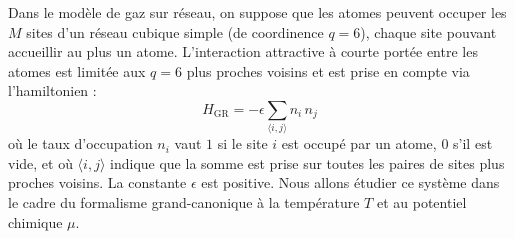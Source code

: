 Dans le modèle de gaz sur réseau, on suppose que les atomes peuvent occuper les $M$ sites d'un réseau cubique simple (de coordinence $q=6$), chaque site pouvant accueillir au plus un atome. L'interaction attractive à courte portée entre les atomes est limitée aux $q=6$ plus proches voisins et est prise en compte via l'hamiltonien :
$$
H_{\mathrm{GR}}=-\epsilon \sum_{\langle i,j\rangle} n_i\, n_j
$$
où le taux d'occupation $n_i$ vaut $1$ si le site $i$ est occupé par un atome, $0$ s'il est vide, et où ${\langle i,j\rangle}$ indique que la somme est prise sur toutes les paires de sites plus proches voisins. La constante $\epsilon$ est positive.  Nous allons étudier ce système dans le cadre du formalisme grand-canonique à la température $T$ et au potentiel chimique $\mu$.